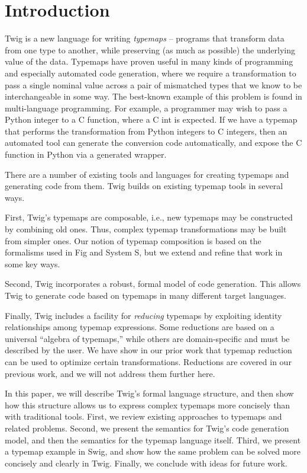 
\section{Introduction}

Twig is a new language for writing \emph{typemaps} -- programs that transform data from one type to another, while preserving (as much as possible) the underlying value of the data. Typemaps have proven useful in many kinds of programming and especially automated code generation, where we require a transformation to pass a single nominal value across a pair of mismatched types that we know to be interchangeable in some way. The best-known example of this problem is found in multi-language programming. For example, a programmer may wish to pass a Python integer to a C function, where a C int is expected. If we have a typemap that performs the transformation from Python integers to C integers, then an automated tool can generate the conversion code automatically, and expose the C function in Python via a generated wrapper.

There are a number of existing tools and languages for creating typemaps and generating code from them. Twig builds on existing typemap tools in several ways.

First, Twig's typemaps are composable, i.e., new typemaps may be constructed by combining old ones. Thus, complex typemap transformations may be built from simpler ones. Our notion of typemap composition is based on the formalisms used in Fig\cite{fig} and System S\cite{system-s}, but we extend and refine that work in some key ways.

Second, Twig incorporates a robust, formal model of code generation. This allows Twig to generate code based on typemaps in many different target languages.

Finally, Twig includes a facility for \emph{reducing} typemaps by exploiting identity relationships among typemap expressions. Some reductions are based on a universal ``algebra of typemaps,'' while others are domain-specific and must be described by the user. We have show in our prior work \cite{ourselves} that typemap reduction can be used to optimize certain transformations. Reductions are covered in our previous work, and we will not address them further here.

In this paper, we will describe Twig's formal language structure, and then show how this structure allows us to express complex typemaps more concisely than with traditional tools. First, we review existing approaches to typemaps and related problems. Second, we present the semantics for Twig's code generation model, and then the semantics for the typemap language itself. Third, we present a typemap example in Swig, and show how the same problem can be solved more concisely and clearly in Twig. Finally, we conclude with ideas for future work.
